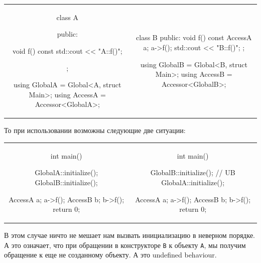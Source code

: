 \begin{center}
\begin{tabular}{cc}
{
\begin{minipage}[\baselineskip]{8cm}
\begin{cppcode}[numbers=none]
class A {
public:

  void f() const {
    std::cout << "A::f()\n";
  }
};


using GlobalA = Global<A, struct Main>;
using AccessA = Accessor<GlobalA>;
\end{cppcode}
\end{minipage}
}&{
\begin{minipage}[\baselineskip]{8cm}
\begin{cppcode}[numbers=none]
class B {
public:
  void f() const {
    AccessA a;
    a->f();
    std::cout << "B::f()\n";
  }
};

using GlobalB = Global<B, struct Main>;
using AccessB = Accessor<GlobalB>;
\end{cppcode}
\end{minipage}
}\\
\end{tabular}
\end{center}
То при использовании возможны следующие две ситуации:
\begin{center}
\begin{tabular}{cc}
{
\begin{minipage}[\baselineskip]{8cm}
\begin{cppcode}[numbers=none]
int main() {
  GlobalA::initialize();
  GlobalB::initialize();
  
  AccessA a;
  a->f();
  AccessB b;
  b->f();
  return 0;
}
\end{cppcode}
\end{minipage}
}&{
\begin{minipage}[\baselineskip]{8cm}
\begin{cppcode}[numbers=none]
int main() {
  GlobalB::initialize();  // UB
  GlobalA::initialize();
  
  AccessA a;
  a->f();
  AccessB b;
  b->f();
  return 0;
}
\end{cppcode}
\end{minipage}
}\\
\end{tabular}
\end{center}
В этом случае ничто не мешает нам вызвать инициализацию в неверном порядке.
А это означает, что при обращении в конструкторе \verb"B" к объекту \verb"A", мы получим обращение к еще не созданному объекту.
А это undefined behaviour.

